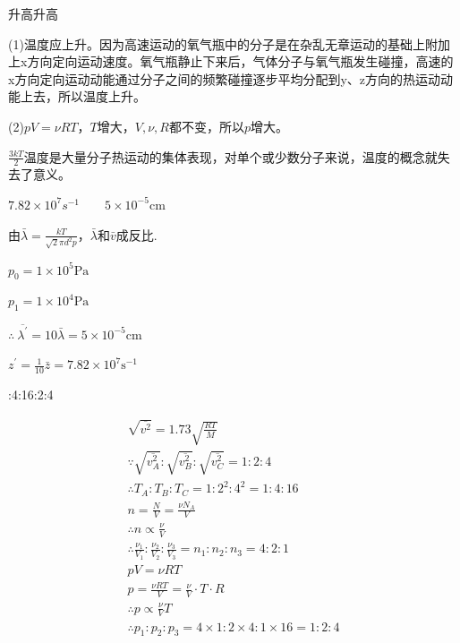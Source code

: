\exercise 升高\qquad 升高

\solve (1)温度应上升。因为高速运动的氧气瓶中的分子是在杂乱无章运动的基础上附加上x方向定向运动速度。氧气瓶静止下来后，气体分子与氧气瓶发生碰撞，高速的x方向定向运动动能通过分子之间的频繁碰撞逐步平均分配到y、z方向的热运动动能上去，所以温度上升。

(2)$pV=\nu RT$，$T$增大，$V,\nu,R$都不变，所以$p$增大。

\exercise $\frac{3kT}{2}$\qquad 温度是大量分子热运动的集体表现，对单个或少数分子来说，温度的概念就失去了意义。

\exercise $7.82 \times 10 ^ { 7 } s ^ { - 1 } \qquad5 \times 10 ^ { - 5 } \mathrm { cm }$

\solve
由$\bar { \lambda } = \frac { k T } { \sqrt { 2 } \pi d^2p }$，$\bar { \lambda } $和$\bar { v } $成反比.

$p _0= 1 \times 10 ^ { 5 }\mathrm{Pa}$

$p _1= 1 \times 10 ^ { 4 }\mathrm{Pa}$

${ \therefore\ \overline{\lambda^{\prime} } = 10 \bar { \lambda } = 5 \times 10 ^ { - 5 }\mathrm{ cm }}$

${ z ^{\prime } = \frac { 1 } { 10 } \bar { z } = 7.82 \times 10 ^ { 7 }\mathrm{s^{-1}}}$

:4:16:2:4

\solve

$$
\begin{array}{*{20}{c}}
 \sqrt {\overline{ v^2}} = 1.73 \sqrt { \frac { R T } { M } } \\
\because \sqrt{\overline{v_A^2}}:\sqrt{\overline{v_B^2}}:\sqrt{\overline{v_C^2}}= 1 : 2 : 4 \\
\therefore T _A: T _B: T _C= 1 : 2 ^2: 4 ^2= 1 : 4 : 16 \\ n = \frac { N } { V } = \frac { \nu N _ { A } } { V } \\
\therefore n \propto \frac { \nu } { V }\\
\therefore \frac { \nu _1} { V _1} : \frac { \nu _2} { V _2} : \frac { \nu _3} { V _3}  = n _1: n _2: n _3= 4 : 2 : 1 \\
p V  = \nu R T \\
p = \frac { \nu R T } { V }  = \frac { \nu } { V } \cdot T \cdot R \\
\therefore p  \propto \frac { \nu } { V } T \\ \therefore p _1: p _2: p _3= 4 \times 1 : 2 \times 4 : 1 \times 16 = 1 : 2 : 4  
\end{array}
$$

